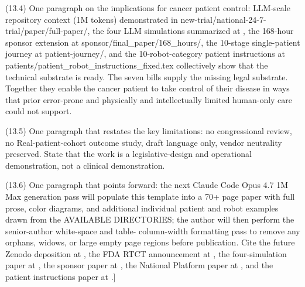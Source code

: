(13.4) One paragraph on the implications for cancer patient control:
LLM-scale repository context (1M tokens) demonstrated in
new-trial/national-24-7-trial/paper/full-paper/, the four LLM
simulations summarized at \cite{kawchak_2026_19994945}, the 168-hour
sponsor extension at sponsor/final\_paper/168\_hours/, the 10-stage
single-patient journey at patient-journey/, and the 10-robot-category
patient instructions at patients/patient\_robot\_instructions\_fixed.tex
collectively show that the technical substrate is ready. The seven
bills supply the missing legal substrate. Together they enable the
cancer patient to take control of their disease in ways that prior
error-prone and physically and intellectually limited human-only care
could not support.

(13.5) One paragraph that restates the key limitations: no
congressional review, no Real-patient-cohort outcome study, draft
language only, vendor neutrality preserved. State that the work is a
legislative-design and operational demonstration, not a clinical
demonstration.

(13.6) One paragraph that points forward: the next Claude Code Opus
4.7 1M Max generation pass will populate this template into a 70+
page paper with full prose, color diagrams, and additional individual
patient and robot examples drawn from the AVAILABLE DIRECTORIES; the
author will then perform the senior-author white-space and table-
column-width formatting pass to remove any orphans, widows, or large
empty page regions before publication. Cite the future Zenodo
deposition at \cite{kawchak_2026_20045457}, the FDA RTCT announcement
at \cite{fda_rtct_press_2026}, the four-simulation paper at
\cite{kawchak_2026_19994945}, the sponsor paper at
\cite{kawchak_2026_19396256}, the National Platform paper at
\cite{kawchak_2026_19244918}, and the patient instructions paper at
\cite{kawchak_2026_18810541}.]
